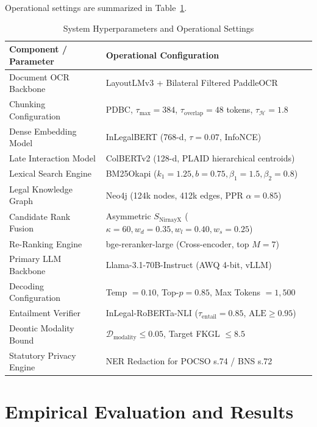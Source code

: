 \documentclass[conference]{IEEEtran}
\begin{document}
Operational settings are summarized in Table~\ref{tab:hyperparameters}.

\begin{table}[!t]
\caption{System Hyperparameters and Operational Settings}
\label{tab:hyperparameters}
\centering
\small
\begin{tabularx}{\columnwidth}{lX}
\toprule
\textbf{Component / Parameter} & \textbf{Operational Configuration} \\
\midrule
Document OCR Backbone & LayoutLMv3 + Bilateral Filtered PaddleOCR \\
Chunking Configuration & PDBC, $\tau_{\max}=384$, $\tau_{\text{overlap}}=48$ tokens, $\tau_{\mathcal{H}}=1.8$ \\
Dense Embedding Model & InLegalBERT (768-d, $\tau=0.07$, InfoNCE) \\
Late Interaction Model & ColBERTv2 (128-d, PLAID hierarchical centroids) \\
Lexical Search Engine & BM25Okapi ($k_1=1.25, b=0.75, \beta_1=1.5, \beta_2=0.8$) \\
Legal Knowledge Graph & Neo4j (124k nodes, 412k edges, PPR $\alpha=0.85$) \\
Candidate Rank Fusion & Asymmetric $S_{\text{NirnayX}}$ ($\kappa=60, w_{d}=0.35, w_{l}=0.40, w_{s}=0.25$) \\
Re-Ranking Engine & bge-reranker-large (Cross-encoder, top $M=7$) \\
Primary LLM Backbone & Llama-3.1-70B-Instruct (AWQ 4-bit, vLLM) \\
Decoding Configuration & Temp $=0.10$, Top-$p=0.85$, Max Tokens $=1,500$ \\
Entailment Verifier & InLegal-RoBERTa-NLI ($\tau_{\text{entail}}=0.85$, $\text{ALE}\ge 0.95$) \\
Deontic Modality Bound & $\mathcal{D}_{\text{modality}} \le 0.05$, Target FKGL $\le 8.5$ \\
Statutory Privacy Engine & NER Redaction for POCSO s.74 / BNS s.72~\cite{dpdpa2023} \\
\bottomrule
\end{tabularx}
\end{table}

\section{Empirical Evaluation and Results}
\end{document}
